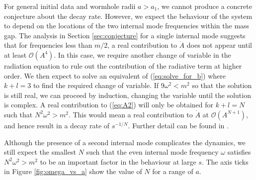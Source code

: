 For general initial data and wormhole radii $a>a_1$, we cannot produce a concrete conjecture about the decay rate. However, we expect the behaviour of the system to depend on the locations of the two internal mode frequencies within the mass gap. The analysis in Section \ref{sec:conjecture} for a single internal mode suggests that for frequencies less than $m/2$, a real contribution to $\dot{A}$ does not appear until at least $\mathcal{O}(A^4)$. In this case, we require another change of variable in the radiation equation to rule out the contribution of the radiative term at higher order. We then expect to solve an equivalent of (\ref{eq:solve_for_b}) where $k+l=3$ to find the required change of variable. If $9\omega^2<m^2$ so that the solution is still real, we can proceed by induction, changing the variable until the solution is complex. A real contribution to (\ref{eq:A2}) will only be obtained for $k+l=N$ such that $N^2\omega^2>m^2$. This would mean a real contribution to $\dot{A}$ at $\mathcal{O}(A^{N+1})$, and hence result in a decay rate of $s^{-1/N}$. Further detail can be found in \cite{SG}.

Although the presence of a second internal mode complicates the dynamics, we still expect the smallest $N$ such that the even internal mode frequency $\omega$ satisfies $N^2\omega^2>m^2$ to be an important factor in the behaviour at large $s$. The axis ticks in Figure \ref{fig:omega_vs_a} show the value of $N$ for a range of $a$.

 


